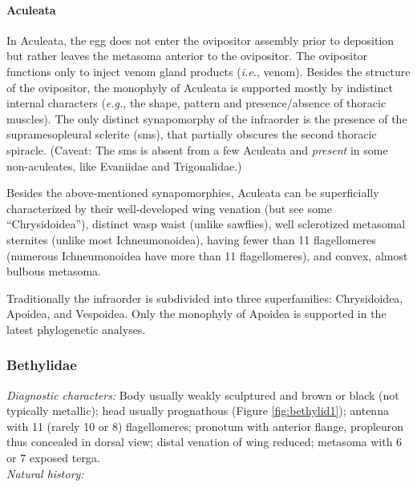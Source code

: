 \documentclass[letterpaper, 11pt]{article}
\begin{document}
\paragraph*{Aculeata} In Aculeata, the egg does not enter the ovipositor assembly prior to deposition but rather leaves the metasoma anterior to the ovipositor. The ovipositor functions only to inject venom gland products (\textit{i.e.}, venom). Besides the structure of the ovipositor, the monophyly of Aculeata is supported mostly by indistinct internal characters (\textit{e.g.}, the shape, pattern and presence/absence of thoracic muscles). The only distinct synapomorphy of the infraorder is the presence of the supramesopleural sclerite (sms), that partially obscures the second thoracic spiracle. (Caveat: The sms is absent from a few Aculeata and \textit{present} in some non-aculeates, like Evaniidae and Trigonalidae.)

Besides the above-mentioned synapomorphies, Aculeata can be superficially characterized by their well-developed wing venation (but see some ``Chrysidoidea''), distinct wasp waist (unlike sawflies), well sclerotized metasomal sternites (unlike most Ichneumonoidea), having fewer than 11 flagellomeres (numerous Ichneumonoidea have more than 11 flagellomeres), and convex, almost bulbous metasoma.

Traditionally the infraorder is subdivided into three superfamilies: Chrysidoidea, Apoidea, and Vespoidea. Only the monophyly of Apoidea is supported in the latest phylogenetic analyses.

\subsubsection{Bethylidae}
\noindent{}\textit{Diagnostic characters:} Body usually weakly sculptured and brown or black (not typically metallic); head usually prognathous (Figure \ref{fig:bethylid1}); antenna with 11 (rarely 10 or 8) flagellomeres; pronotum with anterior flange, propleuron thus concealed in dorsal view; distal venation of wing reduced; metasoma with 6 or 7 exposed terga. \\

\noindent{}\textit{Natural history:} \\
\end{document}
